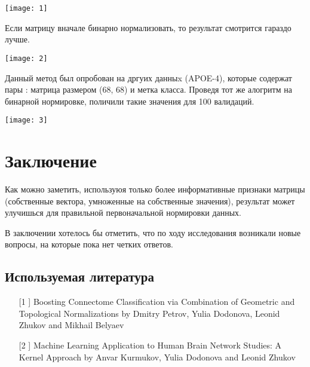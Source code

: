 \documentclass{urticle}
\begin{document}
\texttt{[image: 1]}

Если матрицу вначале бинарно нормализовать, то результат смотрится гараздо лучше.

\texttt{[image: 2]}

Данный метод был опробован на дргуих данныx (APOE-4), которые содержат пары : матрица размером (68, 68) и метка класса. Проведя тот же алогритм на бинарной нормировке, поличили такие значения для 100 валидаций.

\texttt{[image: 3]}

\section*{Заключение}
Как можно заметить, используюя только более информативные признаки матрицы (собственные вектора, умноженные на собственные значения), результат может улучишься для правильной первоначальной нормировки данных.

В заключении хотелось бы отметить, что по ходу исследования возникали новые вопросы, на которые пока нет четких ответов.

\subsection*{Используемая литература}
\begin{enumerate}
	\item[[1]] Boosting Connectome Classification via Combination of Geometric and Topological Normalizations by Dmitry Petrov, Yulia Dodonova, Leonid Zhukov and Mikhail Belyaev
	\item[[2]] Machine Learning Application to Human Brain Network Studies: A Kernel Approach by Anvar Kurmukov, Yulia Dodonova and Leonid Zhukov 


\end{enumerate}
\end{document}
